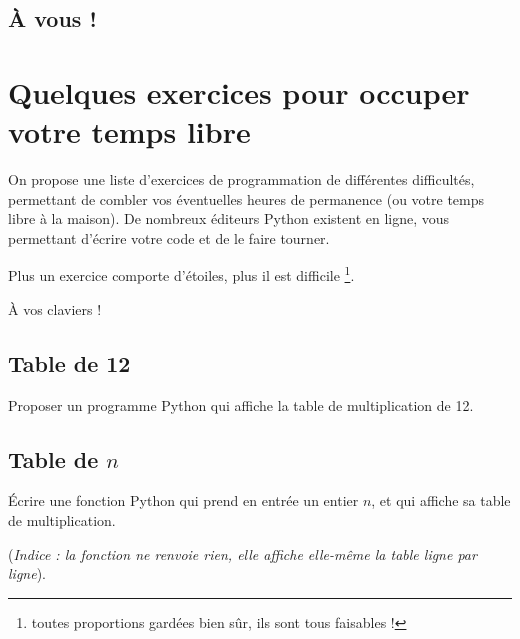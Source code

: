 \documentclass[12pt,a4paper, oneside]{article}
\theoremstyle{definition}
\begin{document}
   \subsection{À vous !}\label{subsec:à-vous-!}
   
\newpage

\section{Quelques exercices pour occuper votre temps libre}\label{sec:quelques-exercices-pour-occuper-votre-temps-libre}
   On propose une liste d'exercices de programmation de différentes difficultés, permettant de combler vos éventuelles heures de permanence (ou votre temps libre à la maison).
   De nombreux éditeurs Python existent en ligne, vous permettant d'écrire votre code et de le faire tourner.

   Plus un exercice comporte d'étoiles, plus il est difficile \footnote{toutes proportions gardées bien sûr, ils sont tous faisables !}.

   À vos claviers !

   \subsection{Table de 12}\label{subsec:table-de-12}
   Proposer un programme Python qui affiche la table de multiplication de 12.

   \subsection{Table de $n$}\label{subsec:table-de-n}
   Écrire une fonction Python qui prend en entrée un entier $n$, et qui affiche sa table de multiplication.

      (\textit{Indice : la fonction ne renvoie rien, elle affiche elle-même la table ligne par ligne}).
\end{document}

